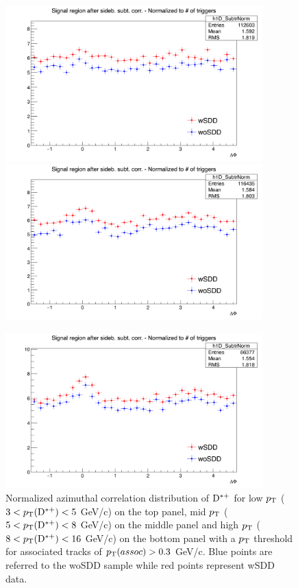 \begin{figure}[!h]
\centering
\includegraphics[width=0.8\linewidth, height=6cm]{figures/wSDD_vs_woSDD/AzimCorrDistr_Dstar_Canvas_PtIntBins2to3_PoolInt_thr0dot3to99dot0_Superimp.png}
\includegraphics[width=0.8\linewidth, height=6cm]{figures/wSDD_vs_woSDD/AzimCorrDistr_Dstar_Canvas_PtIntBins4to6_PoolInt_thr0dot3to99dot0_Superimp.png}

\includegraphics[width=0.8\linewidth, height=6cm]{figures/wSDD_vs_woSDD/AzimCorrDistr_Dstar_Canvas_PtIntBins7to9_PoolInt_thr0dot3to99dot0_Superimp.png}
\caption{Normalized azimuthal correlation distribution of ${\rm D^{*+}}$ for low $p_{\rm T}$ ($3 < p_{\rm T}({\rm D^{*+}}) < 5$ GeV/c) on the top panel, mid $p_{\rm T}$ ($5 < p_{\rm T}({\rm D^{*+}}) < 8$ GeV/c) on the middle panel and high $p_{\rm T}$ ($8 < p_{\rm T}({\rm D^{*+}}) < 16$ GeV/c) on the bottom panel with a $p_{\rm T}$ threshold for associated tracks of $p_{\rm T}(assoc) > 0.3$ GeV/c. Blue points are referred to the woSDD sample while red points represent wSDD data.}
\label{wSSvswoSDD}
\end{figure}

